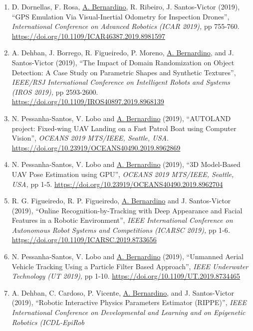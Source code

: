 \begin{enumerate}
  ``Video Based Live Tracking of Fishes in Tanks'', \emph{International
  Conference on Image Analysis and Recognition (ICIAR 2020),} Lecture
  Notes in Computer Science, Springer, vol 12131, pp 161-173.
  \url{https://doi.org/10.1007/978-3-030-50347-5_15}~
\item
  D. Dornellas, F. Rosa, \ul{A. Bernardino}, R. Ribeiro, J.
  Santos-Victor (2019), ``GPS Emulation Via Visual-Inertial Odometry for
  Inspection Drones'', \emph{International Conference on Advanced
  Robotics (ICAR 2019),} pp 755-760.
  \url{https://doi.org/10.1109/ICAR46387.2019.8981597}~
\item
  A. Dehban, J. Borrego, R. Figueiredo, P. Moreno, \ul{A. Bernardino},
  and J. Santos-Victor (2019), ``The Impact of Domain Randomization on
  Object Detection: A Case Study on Parametric Shapes and Synthetic
  Textures'', \emph{IEEE/RSJ International Conference on Intelligent
  Robots and Systems (IROS 2019),} pp 2593-2600.
  \url{https://doi.org/10.1109/IROS40897.2019.8968139}~
\item
  N. Pessanha-Santos, V. Lobo and \ul{A. Bernardino} (2019), ``AUTOLAND
  project: Fixed-wing UAV Landing on a Fast Patrol Boat using Computer
  Vision'', \emph{OCEANS 2019 MTS/IEEE, Seattle, USA}.
  \url{https://doi.org/10.23919/OCEANS40490.2019.8962869}~
\item
  N. Pessanha-Santos, V. Lobo and \ul{A. Bernardino} (2019), ``3D
  Model-Based UAV Pose Estimation using GPU'', \emph{OCEANS 2019
  MTS/IEEE, Seattle, USA,} pp 1-5.
  \url{https://doi.org/10.23919/OCEANS40490.2019.8962704}~
\item
  R. G. Figueiredo, R. P. Figueiredo, \ul{A. Bernardino} and J.
  Santos-Victor (2019), ``Online Recognition-by-Tracking with Deep
  Appearance and Facial Features in a Robotic Environment'', \emph{IEEE
  International Conference on Autonomous Robot Systems and Competitions
  (ICARSC 2019),} pp 1-6\emph{.}
  \url{https://doi.org/10.1109/ICARSC.2019.8733656}
\item
  N. Pessanha-Santos, V. Lobo and \ul{A. Bernardino} (2019), ``Unmanned
  Aerial Vehicle Tracking Using a Particle Filter Based Approach'',
  \emph{IEEE Underwater Technology (UT 2019),} pp 1-10.
  \url{https://doi.org/10.1109/UT.2019.8734465}~
\item
  A. Dehban, C. Cardoso, P. Vicente, \ul{A. Bernardino}, and J.
  Santos-Victor (2019), ``Robotic Interactive Physics Parameters
  Estimator (RIPPE)'', \emph{IEEE International Conference on
  Developmental and Learning and on Epigenetic Robotics (ICDL-EpiRob
}
\end{enumerate}
